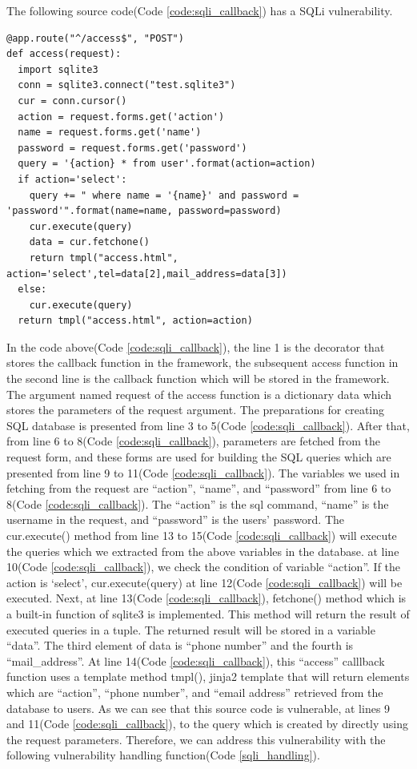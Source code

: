 \documentclass[conference]{IEEEtran}
\begin{document}
The following source code(Code \ref{code:sqli_callback}) has a SQLi vulnerability.
\begin{lstlisting}[caption={A vulnerable function which has a SQL injection.}, label=code:sqli_callback, captionpos=b]
@app.route("^/access$", "POST")
def access(request):
  import sqlite3
  conn = sqlite3.connect("test.sqlite3")
  cur = conn.cursor()
  action = request.forms.get('action')
  name = request.forms.get('name')
  password = request.forms.get('password')
  query = '{action} * from user'.format(action=action)
  if action='select':
    query += " where name = '{name}' and password = 'password'".format(name=name, password=password)
    cur.execute(query)
    data = cur.fetchone()
    return tmpl("access.html", action='select',tel=data[2],mail_address=data[3])
  else:
    cur.execute(query)
  return tmpl("access.html", action=action)
\end{lstlisting}
In the code above(Code \ref{code:sqli_callback}), the line 1 is the decorator that stores the callback function in the framework, the subsequent access function in the second line is the callback function which will be stored in the framework.
The argument named request of the access function is a dictionary data which stores the parameters of the request argument.
The preparations for creating SQL database is presented from line 3 to 5(Code \ref{code:sqli_callback}).
After that, from line 6 to 8(Code \ref{code:sqli_callback}), parameters are fetched from the request form, and these forms are used for building the SQL queries which are presented from line 9 to 11(Code \ref{code:sqli_callback}).
The variables we used in fetching from the request are ``action'', ``name'', and “password” from line 6 to 8(Code \ref{code:sqli_callback}). The “action” is the sql command, “name” is the username in the request, and “password” is the users’ password.
The cur.execute() method from line 13 to 15(Code \ref{code:sqli_callback}) will execute the queries which we extracted from the above variables in the database.
at line 10(Code \ref{code:sqli_callback}), we check the condition of variable “action”. If the action is ‘select’, cur.execute(query) at line 12(Code \ref{code:sqli_callback}) will be executed.
Next, at line 13(Code \ref{code:sqli_callback}), fetchone() method which is a built-in function of sqlite3 is implemented.
This method will return the result of executed queries in a tuple.
The returned result will be stored in a variable “data”. The third element of data is “phone number” and the fourth is “mail\_address”.
At line 14(Code \ref{code:sqli_callback}), this “access” calllback function uses a template method tmpl(), jinja2 template that will return elements which are “action”, “phone number”, and “email address” retrieved from the database to users.
As we can see that this source code is vulnerable, at lines 9 and 11(Code \ref{code:sqli_callback}), to the query which is created by directly using the request parameters.
Therefore, we can address this vulnerability with the following vulnerability handling function(Code \ref{sqli_handling}).
\end{document}
